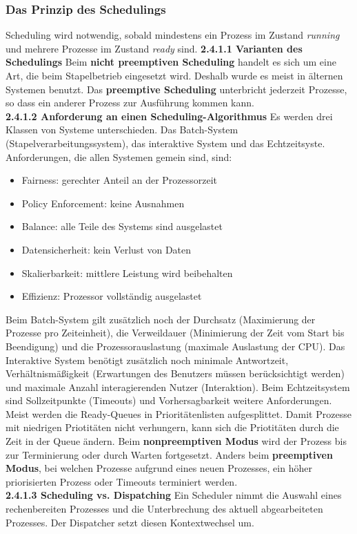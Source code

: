 \documentclass{article}
\begin{document}
\subsubsection{Das Prinzip des Schedulings}
    Scheduling wird notwendig, sobald mindestens ein Prozess im Zustand \textit{running} und mehrere Prozesse im Zustand \textit{ready} sind.
    \textbf{2.4.1.1 Varianten des Schedulings}\newline
    Beim \textbf{nicht preemptiven Scheduling} handelt es sich um eine Art, die beim Stapelbetrieb eingesetzt wird. Deshalb wurde es meist in älternen Systemen benutzt. Das \textbf{preemptive Scheduling} unterbricht jederzeit Prozesse, so dass ein anderer Prozess zur Ausführung kommen kann.\newline
    \\
    \textbf{2.4.1.2 Anforderung an einen Scheduling-Algorithmus}\newline
    Es werden drei Klassen von Systeme unterschieden. Das Batch-System (Stapelverarbeitungssystem), das interaktive System und das Echtzeitsyste.\newline
    Anforderungen, die allen Systemen gemein sind, sind:
    \begin{itemize}
        \item Fairness: gerechter Anteil an der Prozessorzeit
        \item Policy Enforcement: keine Ausnahmen
        \item Balance: alle Teile des Systems sind ausgelastet
        \item Datensicherheit: kein Verlust von Daten
        \item Skalierbarkeit: mittlere Leistung wird beibehalten
        \item Effizienz: Prozessor vollständig ausgelastet
    \end{itemize}
    Beim Batch-System gilt zusätzlich noch der Durchsatz (Maximierung der Prozesse pro Zeiteinheit), die Verweildauer (Minimierung der Zeit vom Start bis Beendigung) und die Prozessorauslastung (maximale Auslastung der CPU). Das Interaktive System benötigt zusätzlich noch minimale Antwortzeit, Verhältnismäßigkeit (Erwartungen des Benutzers müssen berücksichtigt werden) und maximale Anzahl interagierenden Nutzer (Interaktion). Beim Echtzeitsystem sind Sollzeitpunkte (Timeouts) und Vorhersagbarkeit weitere Anforderungen.\newline
    Meist werden die Ready-Queues in Prioritätenlisten aufgesplittet. Damit Prozesse mit niedrigen Priotitäten nicht verhungern, kann sich die Priotitäten durch die Zeit in der Queue ändern.\newline
    Beim \textbf{nonpreemptiven Modus} wird der Prozess bis zur Terminierung oder durch Warten fortgesetzt. Anders beim \textbf{preemptiven Modus}, bei welchen Prozesse aufgrund eines neuen Prozesses, ein höher priorisierten Prozess oder Timeouts terminiert werden.\newline
    \\
    \textbf{2.4.1.3 Scheduling vs. Dispatching}\newline
    Ein Scheduler nimmt die Auswahl eines rechenbereiten Prozesses und die Unterbrechung des aktuell abgearbeiteten Prozesses. Der Dispatcher setzt diesen Kontextwechsel um.
\end{document}
